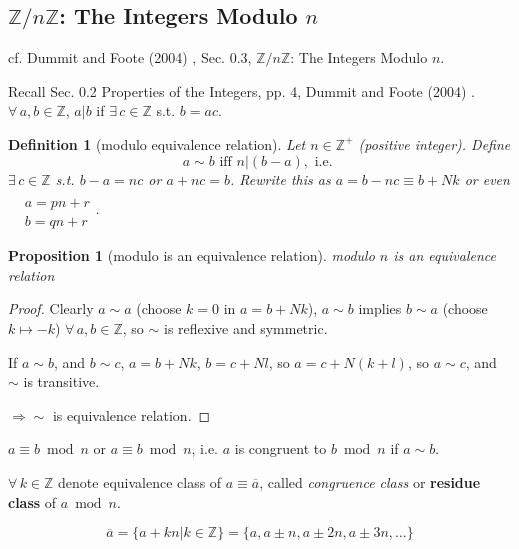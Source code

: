 \documentclass[10pt]{amsart}
\newtheorem{proposition}{Proposition}
\newtheorem{definition}{Definition}
\begin{document}
\begin{multicols*}{2}
\subsection{$\mathbb{Z} / n \mathbb{Z}$: The Integers Modulo $n$}

cf. Dummit and Foote (2004) \cite{DuFo2003}, Sec. 0.3, $\mathbb{Z}/n\mathbb{Z}$: The Integers Modulo $n$.

Recall Sec. 0.2 Properties of the Integers, pp. 4, Dummit and Foote (2004) \cite{DuFo2003}. $\forall \, a, b \in \mathbb{Z}$, $a | b$ if $\exists \, c \in \mathbb{Z}$ s.t. $b=ac$. 

\begin{definition}[modulo equivalence relation]
Let $n\in \mathbb{Z}^+$ (positive integer). Define
\begin{equation}
a \sim b \text{ iff } n | (b-a), \text{ i.e. } 
\end{equation}
$\exists \, c \in \mathbb{Z}$ s.t. $b-a = nc$ or $a+nc = b$. Rewrite this as $a= b- nc \equiv b + Nk$ or even $\begin{aligned} & \quad \\ & a = pn + r \\ & b = qn + r \end{aligned}$. 
\end{definition} 

\begin{proposition}[modulo is an equivalence relation]
	modulo $n$ is an equivalence relation
\end{proposition} 

\begin{proof}
Clearly $a \sim a$ (choose $k=0$ in $a= b + Nk$), $a\sim b$ implies $b\sim a$ (choose $k \mapsto -k$) $\forall \, a, b \in \mathbb{Z}$, so $\sim $ is reflexive and symmetric.

If $a\sim b$, and $b\sim c$, $a= b + Nk$, $b=c +Nl$, so $a= c + N(k+l)$, so $a\sim c$, and $\sim$ is transitive.

$\Longrightarrow \sim$ is equivalence relation.

\end{proof} 

$a \equiv b \bmod{n}$ or $a \equiv b \bmod{n}$, i.e. $a$ is congruent to $b \bmod{n}$ if $a\sim b$. 

$\forall \, k \in \mathbb{Z}$ denote equivalence class of $a \equiv \overline{a}$, called \emph{congruence class} or \textbf{residue class} of $a\bmod{n}$.

\begin{equation}
\overline{a} = \lbrace a + kn | k \in \mathbb{Z} \rbrace = \lbrace a , a \pm n, a \pm 2n, a \pm 3n ,\dots \rbrace 
\end{equation}


\end{multicols*}
\end{document}
